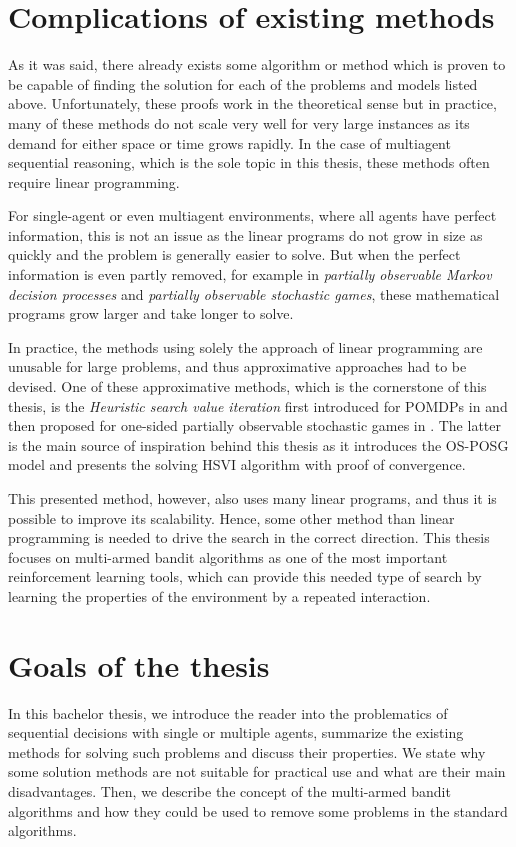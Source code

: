 \documentclass[../main.tex]{subfiles}
\begin{document}
\section{Complications of existing methods}\label{intro:compilcations}
As it was said, there already exists some algorithm or method which is proven to be capable of finding the solution for each of the problems and models listed above.
Unfortunately, these proofs work in the theoretical sense but in practice, many of these methods do not scale very well for very large instances as its demand for either space or time grows rapidly.
In the case of multiagent sequential reasoning, which is the sole topic in this thesis, these methods often require linear programming.

For single-agent or even multiagent environments, where all agents have perfect information, this is not an issue as the linear programs do not grow in size as quickly and the problem is generally easier to solve.
But when the perfect information is even partly removed, for example in \textit{partially observable Markov decision processes} and \textit{partially observable stochastic games}, these mathematical programs grow larger and take longer to solve.

In practice, the methods using solely the approach of linear programming are unusable for large problems, and thus approximative approaches had to be devised.
One of these approximative methods, which is the cornerstone of this thesis, is the \textit{Heuristic search value iteration} first introduced for POMDPs in \cite{hsvi} and then proposed for one-sided partially observable stochastic games in \cite{osposgs}.
The latter is the main source of inspiration behind this thesis as it introduces the OS-POSG model and presents the solving HSVI algorithm with proof of convergence.

This presented method, however, also uses many linear programs, and thus it is possible to improve its scalability.
Hence, some other method than linear programming is needed to drive the search in the correct direction.
This thesis focuses on multi-armed bandit algorithms \cite{bandits} as one of the most important reinforcement learning tools, which can provide this needed type of search by learning the properties of the environment by a repeated interaction.

\section{Goals of the thesis}\label{intro:goals}
In this bachelor thesis, we introduce the reader into the problematics of sequential decisions with single or multiple agents, summarize the existing methods for solving such problems and discuss their properties.
We state why some solution methods are not suitable for practical use and what are their main disadvantages.
Then, we describe the concept of the multi-armed bandit algorithms and how they could be used to remove some problems in the standard algorithms.
\end{document}
